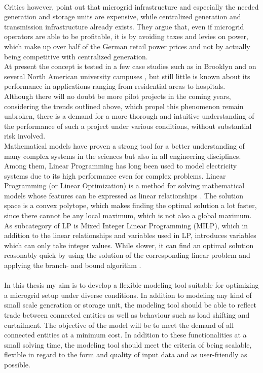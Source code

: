 \documentclass[
	11pt,								%
	DIV10,								%
	a4paper,         					%
	oneside,							%
	headheight=20pt,					%
	footheight=20pt,					%
    parskip=full,						%
    listof=totoc,						%
	bibliography=totoc,					%
	index=totoc,						%
]{scrartcl}
\begin{document}
\\
Critics however, point out that microgrid infrastructure and especially the needed generation and storage units are expensive, while centralized generation and transmission infrastructure already exists. They argue that, even if microgrid operators are able to be profitable, it is by avoiding taxes and levies on power, which make up over half of the German retail power prices  and not by actually being competitive with centralized generation.
\\
At present the concept is tested in a few case studies such as in Brooklyn  and on several North American university campuses , but still little is known about its performance in applications ranging from residential areas to hospitals.
\\
Although there will no doubt be more pilot projects in the coming years, considering the trends outlined above, which propel this phenomenon remain unbroken, there is a demand for a more thorough and intuitive understanding of the performance of such a project under various conditions, without substantial risk involved.
\\
Mathematical models have proven a strong tool for a better understanding of many complex systems in the sciences but also in all engineering disciplines. Among them, Linear Programming has long been used to model electricity systems due to its high performance even for complex problems. Linear Programming (or Linear Optimization) is a method for solving mathematical models whose features can be expressed as linear relationships . The solution space is a convex polytope, which makes finding the optimal solution a lot faster, since there cannot be any local maximum, which is not also a global maximum. As subcategory of LP is Mixed Integer Linear Programming (MILP), which in addition to the linear relationships and variables used in LP, introduces variables which can only take integer values. While slower, it can find an optimal solution reasonably quick by using the solution of the corresponding linear problem and applying the branch- and bound algorithm . 
\\\\
In this thesis my aim is to develop a flexible modeling tool suitable for optimizing a microgrid setup under diverse conditions. In addition to modeling any kind of small scale generation or storage unit, the modeling tool should be able to reflect trade between connected entities as well as behaviour such as load shifting and curtailment. The objective of the model will be to meet the demand of all connected entities at a minimum cost. In addition to these functionalities at a small solving time, the modeling tool should meet the criteria of being scalable, flexible in regard to the form and quality of input data and as user-friendly as possible.\\
\end{document}
